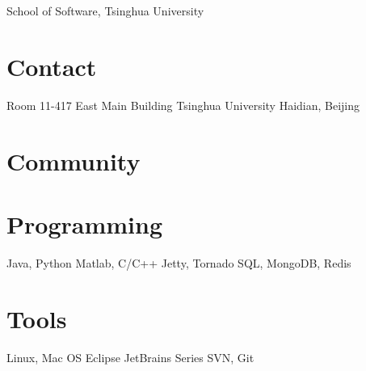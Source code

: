 \documentclass[]{friggeri-cv}
\begin{document}
       {School of Software, Tsinghua University}

\begin{aside}
  \section{Contact}
    Room 11-417
    East Main Building
    Tsinghua University
    Haidian, Beijing
  \section{Community}
  \section{Programming}
    Java, Python
    Matlab, C/C++
    Jetty, Tornado
    SQL, MongoDB, Redis
  \section{Tools}
    Linux, Mac OS
    Eclipse
    JetBrains Series
    SVN, Git
\end{aside}


\end{document}
